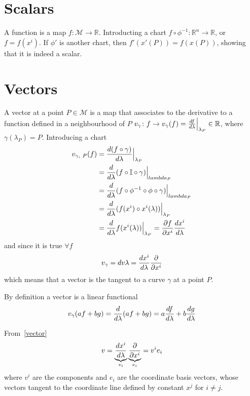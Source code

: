 \section{Scalars}

    A function is a map $f \colon \mathcal M \rightarrow \mathbb R$. Introducting a chart $f \circ \phi^{-1} \colon \mathbb R^n \rightarrow \mathbb R$, or $f = f(x^i)$. If $\phi'$ is another chart, then $f'(x'(P)) = f(x(P))$, showing that it is indeed a scalar. 

\section{Vectors}

    A vector at a point $P \in \mathcal M$ is a map that associates to the derivative to a function defined in a neighbourhood of $P$ $v_{\gamma} \colon f \rightarrow v_\gamma(f) = \frac{df}{d\lambda}\Big\vert_{\lambda_P} \in \mathbb R$, where $\gamma(\lambda_P) = P$. Introducing a chart 
    \begin{equation*}
    \begin{aligned}
        v_{\gamma, ~P} (f) & = \frac{d(f \circ \gamma)}{d\lambda}\Big\vert_{\lambda_P} \\ & = \frac{d}{d\lambda} (f \circ \mathbb I \circ \gamma) \Big\vert_{lambda_P} \\ & = \frac{d}{d\lambda} (f \circ \phi^{-1} \circ \phi \circ \gamma) \Big\vert_{lambda_P} \\ & = \frac{d}{d\lambda} (f(x^i) \circ x^i(\lambda)) \Big\vert_{\lambda_P} \\ & = \frac{d}{d\lambda} f(x^i(\lambda)) \Big\vert_{\lambda_P} = \frac{\partial f}{\partial x^i} \frac{dx^i}{d\lambda}
    \end{aligned}
    \end{equation*}
    and since it is true $\forall f$
    \begin{equation}\label{vector}
        v_\gamma = dv{}{\lambda} = \frac{dx^i}{d\lambda} \frac{\partial}{\partial x^i}
    \end{equation}
    which means that a vector is the tangent to a curve $\gamma$ at a point $P$.

    By definition a vector is a linear functional
    \begin{equation*}
        v_\gamma (af + bg) = \frac{d}{d\lambda} (af+bg) = a \frac{df}{d\lambda} + b \frac{dg}{d\lambda}
    \end{equation*}

    From~\eqref{vector}
    \begin{equation*}
        v = \underbrace{\frac{dx^i}{d\lambda}}_{v_i} \underbrace{\frac{\partial}{\partial x^i}}_{e_i} = v^i e_i
    \end{equation*}
    where $v^i$ are the components and $e_i$ are the coordinate basis vectors, whose vectors tangent to the coordinate line defined by constant $x^j$ for $i \neq j$.

